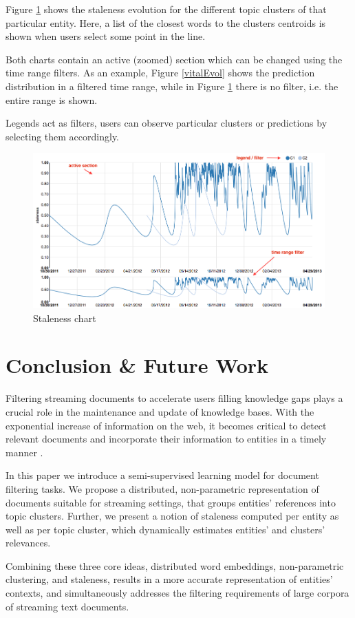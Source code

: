 \documentclass{article}
\begin{document}
{{Figure \ref{stalenessEvol} shows the staleness evolution for the different topic clusters of that particular entity. Here, a list of the closest words to the clusters centroids is shown when users select some point in the line.

Both charts contain an active (zoomed) section which can be changed using the time range filters. As an example, Figure \ref{vitalEvol} shows the prediction distribution in a filtered time range, while in Figure \ref{stalenessEvol} there is no filter, i.e. the entire range is shown.

Legends act as filters, users can observe particular clusters or predictions by selecting them accordingly.

\begin{figure}[h!]
\centering
\includegraphics[width=.5\textwidth]{fig/stalenessDistribution.png}
\caption{Staleness chart}
\label{stalenessEvol}
\end{figure}


\section{Conclusion \& Future Work}
\label{conclusion}

Filtering streaming documents to accelerate users filling knowledge gaps plays a crucial role in the maintenance and update of knowledge bases.
With the exponential increase of information on the web, it becomes critical to detect relevant documents and incorporate their information to entities in a timely manner \cite{jingang13}.

In this paper we introduce a semi-supervised learning model for document filtering tasks. We propose a distributed, non-parametric representation of documents suitable for streaming settings, that groups entities' references into topic clusters. Further, we present a notion of staleness computed per entity as well as per topic cluster, which dynamically estimates entities' and clusters' relevances.

Combining these three core ideas, distributed word embeddings, non-parametric clustering, and staleness, results in a more accurate representation of entities' contexts, and simultaneously addresses the filtering requirements of large corpora of streaming text documents.

}}
\end{document}
